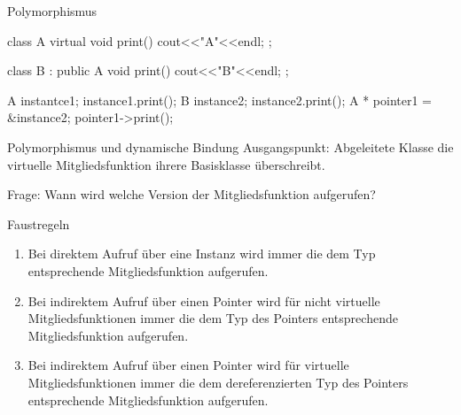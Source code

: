 \ifnum\conditionmacro=1 \documentclass[handout,usenames,dvipsnames]{beamer}\fi
\begin{document}
\begin{frame}[fragile]{Polymorphismus}
\begin{TFCpp}
class A {
	virtual void print() 
	{cout<<"A"<<endl;}
};

class B : public A {
	void print()
	{cout<<"B"<<endl;}
};

A instantce1;
instance1.print();
B instance2;
instance2.print();
A * pointer1 = &instance2;
pointer1->print();
\end{TFCpp}
\end{frame}


\begin{frame}{Polymorphismus und dynamische Bindung}
Ausgangspunkt: Abgeleitete Klasse die virtuelle Mitgliedsfunktion ihrere Basisklasse überschreibt.

Frage: Wann wird welche Version der Mitgliedsfunktion aufgerufen?
\begin{block}{Faustregeln}
\begin{enumerate}
\item Bei direktem Aufruf über eine Instanz wird immer die dem Typ entsprechende Mitgliedsfunktion aufgerufen.
\item Bei indirektem Aufruf über einen Pointer wird für nicht virtuelle Mitgliedsfunktionen immer die dem Typ des Pointers entsprechende Mitgliedsfunktion aufgerufen.
\item Bei indirektem Aufruf über einen Pointer wird für virtuelle Mitgliedsfunktionen immer die dem dereferenzierten Typ des Pointers entsprechende Mitgliedsfunktion aufgerufen.
\end{enumerate}
\end{block}
\end{frame}
\end{document}
